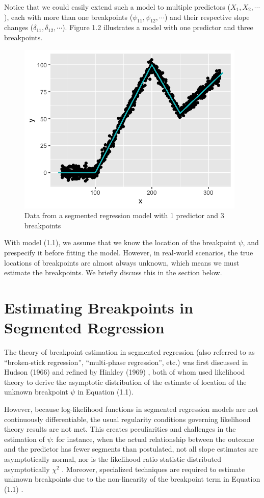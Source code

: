 \documentclass [12pt, proquest] {uwthesis}[2016/11/22]
\begin{document}
Notice that we could easily extend such a model to multiple predictors ($X_1, X_2, \cdots$), each with more than one breakpoints ($\psi_{11}, \psi_{12}, \cdots$) and their respective slope changes ($\delta_{11}, \delta_{12}, \cdots$). Figure 1.2 illustrates a model with one predictor and three breakpoints.

\begin{figure}
    \centering
    \includegraphics[width = 4 in]{Plot1_2.png}
    \caption{Data from a segmented regression model with 1 predictor and 3 breakpoints}
\end{figure}

With model (1.1), we assume that we know the location of the breakpoint $\psi$, and prespecify it before fitting the model. However, in real-world scenarios, the true locations of breakpoints are almost always unknown, which means we must estimate the breakpoints. We briefly discuss this in the section below.
 
\section{Estimating Breakpoints in Segmented Regression}

The theory of breakpoint estimation in segmented regression (also referred to as ``broken-stick regression'', ``multi-phase regression'', etc.) was first discussed in Hudson (1966) \cite{DH1966} and refined by Hinkley (1969) \cite{DH1969}, both of whom used likelihood theory to derive the asymptotic distribution of the estimate of location of the unknown breakpoint $\psi$ in Equation (1.1). 

However, because log-likelihood functions in segmented regression models are not continuously differentiable, the usual regularity conditions governing likelihood theory results are not met. This creates peculiarities and challenges in the estimation of $\psi$: for instance, when the actual relationship between the outcome and the predictor has fewer segments than postulated, not all slope estimates are asymptotically normal, nor is the likelihood ratio statistic distributed asymptotically $\chi^2$ \cite{PL1980}. Moreover, specialized techniques are required to estimate unknown breakpoints due to the non-linearity of the breakpoint term in Equation (1.1) \cite{PF1975a, PF1975b}.
\end{document}
